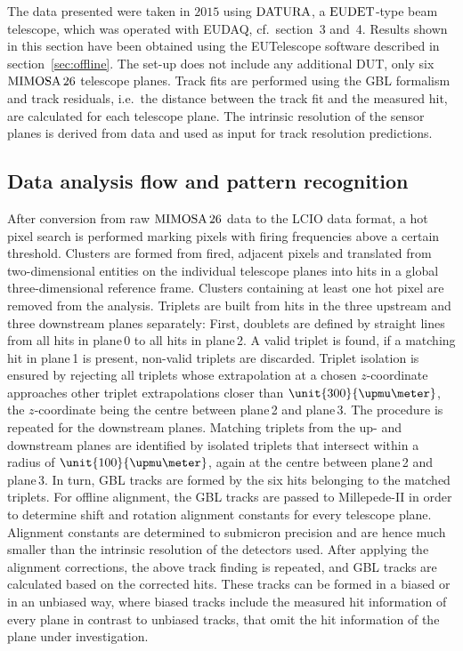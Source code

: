 
The data presented were taken in $2015$ using $\textrm{DATURA}$, a $\textrm{EUDET}$-type beam telescope, which was operated with EUDAQ, cf.~section~3 and~4. 
Results shown in this section have been obtained using the EUTelescope software described in section~\ref{sec:offline}. 
The set-up does not include any additional DUT, only six $\textrm{MIMOSA\,26}$ telescope planes. 
Track fits are performed using the GBL formalism and track residuals, i.e.\ the distance between the track fit and the measured hit,
 are calculated for each telescope plane. 
The intrinsic resolution of the sensor planes is derived from data and used as input for track resolution predictions. 
 

\subsection{Data analysis flow and pattern recognition}
\label{sec:datura-nodut}

After conversion from raw $\textrm{MIMOSA\,26}$ data to the LCIO data format, a hot pixel search is performed marking pixels with firing frequencies above a certain threshold.
Clusters are formed from fired, adjacent pixels and translated from two-dimensional entities on the individual telescope planes into hits in a global three-dimensional reference frame.
Clusters containing at least one hot pixel are removed from the analysis. 
Triplets are built from hits in the three upstream and three downstream planes separately: 
First, doublets are defined by straight lines from all hits in plane\,0 to all hits in plane\,2. 
A valid triplet is found, if a matching hit in plane\,1 is present, non-valid triplets are discarded.  
Triplet isolation is ensured by rejecting all triplets whose extrapolation at a chosen $z$-coordinate approaches other triplet extrapolations closer than $\unit{300}{\upmu\meter}$,
 the $z$-coordinate being the centre between plane\,2 and plane\,3. 
The procedure is repeated for the downstream planes. 
Matching triplets from the up- and downstream planes are identified by isolated triplets that intersect within a radius of $\unit{100}{\upmu\meter}$, again at the centre between plane\,2 and plane\,3. 
In turn, GBL tracks are formed by the six hits belonging to the matched triplets. 
For offline alignment, the GBL tracks are passed to \mbox{Millepede-II} in order to determine shift and rotation alignment constants for every telescope plane.
Alignment constants are determined to submicron precision and are hence much smaller than the intrinsic resolution of the detectors used. 
After applying the alignment corrections, the above track finding is repeated, and GBL tracks are calculated based on the corrected hits. 
These tracks can be formed in a \textrm{biased} or in an \textrm{unbiased} way, where biased tracks include the measured hit information of every plane in contrast to unbiased tracks,
 that omit the hit information of the plane under investigation. 

